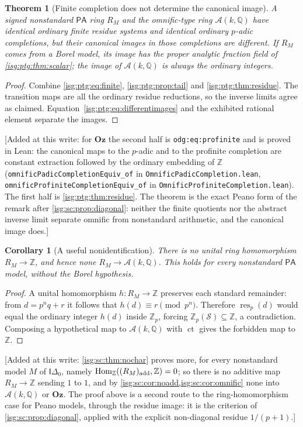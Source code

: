 \documentclass[11pt]{article}
\newtheorem{theorem}{Theorem}[section]
\newtheorem{corollary}[corollary]{Corollary}
\theoremstyle{definition}
\theoremstyle{remark}
\newcommand{\Oz}{\ensuremath{\mathbf{Oz}}}
\newcommand{\Z}{\mathbb{Z}}
\newcommand{\ct}{\operatorname{ct}}
\newcommand{\Q}{\mathbb{Q}}
\newcommand{\res}{\operatorname{res}}
\newcommand{\Hom}{\operatorname{Hom}}
\newcommand{\Idelta}{\mathsf{I}\Delta_0}
\newcommand{\Asc}{\mathcal{A}}
\newcommand{\Zp}{\mathbb{Z}_p}
\newcommand{\PA}{\mathsf{PA}}
\newcommand{\replabel}[1]{\nolinkurl{#1}}
\newcommand{\fn}[1]{\nolinkurl{#1}}
\begin{document}
\begin{theorem}[Finite completion does not determine the canonical image]\label{isg:ptg:thm:completions}
A signed nonstandard $\PA$ ring $R_M$ and the omnific-type ring $\Asc(k,\Q)$
have identical ordinary finite residue systems and identical ordinary
$p$-adic completions, but their canonical images in those completions are
different. If $R_M$ comes from a Borel model, its image has the proper
analytic fraction field of \cref{isg:ptg:thm:scalar}; the image of
$\Asc(k,\Q)$ is always the ordinary integers.
\end{theorem}
\begin{proof}
Combine \eqref{isg:ptg:eq:finite}, \cref{isg:ptg:prop:tail} and
\cref{isg:ptg:thm:residue}. The transition maps are all the ordinary
residue reductions, so the inverse limits agree as claimed.
Equation~\eqref{isg:ptg:eq:differentimages} and the exhibited rational
element separate the images.
\end{proof}

\textup{[}Added at this write: for $\Oz$ the second half is
\replabel{odg:eq:profinite} and is proved in Lean: the canonical maps to
the $p$-adic and to the profinite completion are constant extraction
followed by the ordinary embedding of $\Z$ (\fn{omnificPadicCompletionEquiv_of}
in \fn{OmnificPadicCompletion.lean}, \fn{omnificProfiniteCompletionEquiv_of}
in \fn{OmnificProfiniteCompletion.lean}). The first half is
\cref{isg:ptg:thm:residue}. The theorem is the exact Peano form of the
remark after \cref{isg:sc:prop:diagonal}: neither the finite quotients nor
the abstract inverse limit separate omnific from nonstandard arithmetic,
and the canonical image does.\textup{]}

\begin{corollary}[A useful nonidentification]\label{isg:ptg:cor:nomap}
There is no unital ring homomorphism $R_M\to\Z$, and hence none
$R_M\to\Asc(k,\Q)$. This holds for every nonstandard $\PA$ model, without
the Borel hypothesis.
\end{corollary}
\begin{proof}
A unital homomorphism $h:R_M\to\Z$ preserves each standard remainder: from
$d=p^nq+r$ it follows that $h(d)\equiv r\pmod{p^n}$. Therefore $\res_p(d)$
would equal the ordinary integer $h(d)$ inside $\Zp$, forcing
$\Zp(\mathcal S)\subseteq\Z$, a contradiction. Composing a hypothetical map
to $\Asc(k,\Q)$ with $\ct$ gives the forbidden map to $\Z$.
\end{proof}

\textup{[}Added at this write: \cref{isg:sc:thm:nochar} proves more,
for every nonstandard model $M$ of $\Idelta$, namely
$\Hom_\Z((R_M)_{\rm add},\Z)=0$; so there is no additive map $R_M\to\Z$ sending $1$ to $1$, and by
\cref{isg:sc:cor:noadd,isg:sc:cor:omnific} none into $\Asc(k,\Q)$ or $\Oz$.
The proof above is a second route to the ring-homomorphism case for
Peano models, through the residue image: it is the criterion of
\cref{isg:sc:prop:diagonal}, applied with the explicit non-diagonal
residue $1/(p+1)$.\textup{]}
\end{document}
